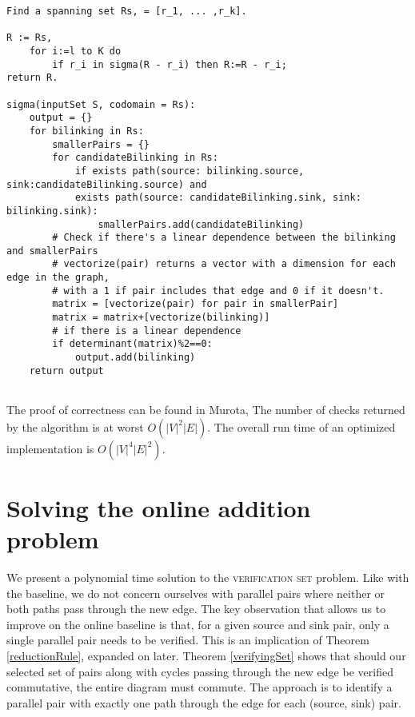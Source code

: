 \documentclass[sigplan,review,anonymous]{acmart}
\begin{document}
\begin{verbatim}
Find a spanning set Rs, = [r_1, ... ,r_k].

R := Rs,
    for i:=l to K do
        if r_i in sigma(R - r_i) then R:=R - r_i;
return R.

sigma(inputSet S, codomain = Rs):
    output = {}
    for bilinking in Rs:
        smallerPairs = {}
        for candidateBilinking in Rs:
            if exists path(source: bilinking.source, sink:candidateBilinking.source) and
            exists path(source: candidateBilinking.sink, sink: bilinking.sink):
                smallerPairs.add(candidateBilinking)
        # Check if there's a linear dependence between the bilinking and smallerPairs
        # vectorize(pair) returns a vector with a dimension for each edge in the graph,
        # with a 1 if pair includes that edge and 0 if it doesn't.
        matrix = [vectorize(pair) for pair in smallerPair]
        matrix = matrix+[vectorize(bilinking)]
        # if there is a linear dependence
        if determinant(matrix)%2==0:
            output.add(bilinking)
    return output
                
\end{verbatim}

The proof of correctness can be found in Murota\cite{commutative}, 
The number of checks returned by the algorithm is at worst $O(|V|^2|E|)$. The overall run time of an optimized implementation is $O(|V|^4|E|^2)$.

\section{Solving the online addition problem}

We present a polynomial time solution to the \textsc{verification set} problem.
Like with the baseline, we do not concern ourselves with parallel pairs where neither or both paths pass through the new edge.
The key observation that allows us to improve on the online baseline is that, for a given source and sink pair, only a single parallel pair needs to be verified. 
This is an implication of Theorem \ref{reductionRule}, expanded on later.
Theorem \ref{verifyingSet} shows that should our selected set of pairs along with cycles passing through the new edge be verified commutative, the entire diagram must commute. The approach is to identify a parallel pair with exactly one path through the edge for each (source, sink) pair.
\end{document}
